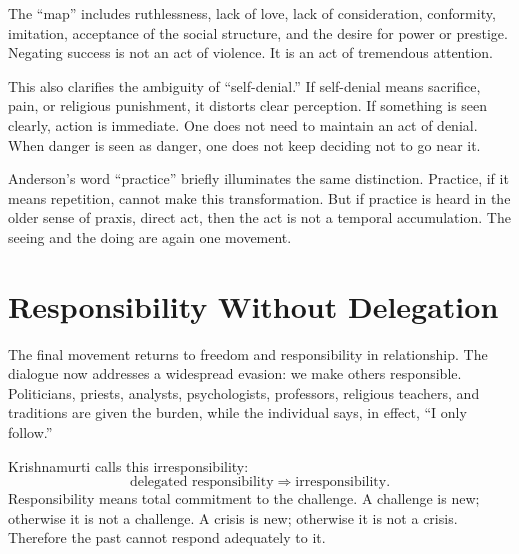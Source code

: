 The ``map'' includes ruthlessness, lack of love, lack of consideration, conformity, imitation, acceptance of the social structure, and the desire for power or prestige. Negating success is not an act of violence. It is an act of tremendous attention.

\begin{figure}
\centering
{}
\end{figure}

This also clarifies the ambiguity of ``self-denial.'' If self-denial means sacrifice, pain, or religious punishment, it distorts clear perception. If something is seen clearly, action is immediate. One does not need to maintain an act of denial. When danger is seen as danger, one does not keep deciding not to go near it.

Anderson's word ``practice'' briefly illuminates the same distinction. Practice, if it means repetition, cannot make this transformation. But if practice is heard in the older sense of praxis, direct act, then the act is not a temporal accumulation. The seeing and the doing are again one movement.

\section{Responsibility Without Delegation}

The final movement returns to freedom and responsibility in relationship. The dialogue now addresses a widespread evasion: we make others responsible. Politicians, priests, analysts, psychologists, professors, religious teachers, and traditions are given the burden, while the individual says, in effect, ``I only follow.''

Krishnamurti calls this irresponsibility:
\begin{equation}
\text{delegated responsibility}
\Longrightarrow
\text{irresponsibility}.
\end{equation}
Responsibility means total commitment to the challenge. A challenge is new; otherwise it is not a challenge. A crisis is new; otherwise it is not a crisis. Therefore the past cannot respond adequately to it.

